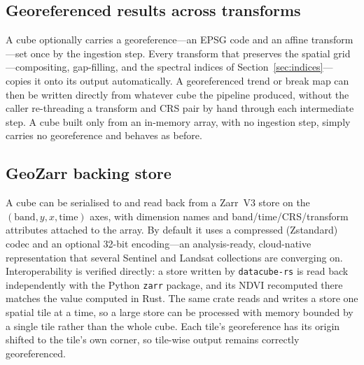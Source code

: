 \documentclass[review]{elsarticle}
\begin{document}
\subsection{Georeferenced results across transforms}
\label{sec:georef}
A cube optionally carries a georeference---an EPSG code and an affine
transform---set once by the ingestion step. Every transform that preserves
the spatial grid---compositing, gap-filling, and the spectral indices of
Section~\ref{sec:indices}---copies it onto its output automatically. A
georeferenced trend or break map can then be written directly from whatever
cube the pipeline produced, without the caller re-threading a transform and
CRS pair by hand through each intermediate step. A cube built only from an
in-memory array, with no ingestion step, simply carries no georeference and
behaves as before.

\subsection{GeoZarr backing store}
\label{sec:zarr}
A cube can be serialised to and read back from a Zarr~V3 store on the
$(\mathrm{band}, y, x, \mathrm{time})$ axes, with dimension names and
band/time/CRS/transform attributes attached to the array. By default it uses
a compressed (Zstandard) codec and an optional 32-bit encoding---an
analysis-ready, cloud-native representation that several Sentinel and
Landsat collections are converging on. Interoperability is verified
directly: a store written by \texttt{datacube-rs} is read back independently
with the Python \texttt{zarr} package, and its NDVI recomputed there matches
the value computed in Rust. The same crate reads and writes a store one
spatial tile at a time, so a large store can be processed with memory
bounded by a single tile rather than the whole cube. Each tile's
georeference has its origin shifted to the tile's own corner, so tile-wise
output remains correctly georeferenced.
\end{document}
